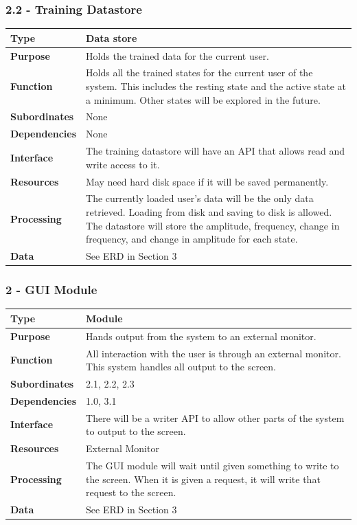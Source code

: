 \documentclass{article}
\begin{document}
\subsubsection*{2.2 - Training Datastore}
\begin{tabular}{ | l |  p{13.3cm} |}
\hline
\textbf{Type} & Data store \\ \hline
\textbf{Purpose} & Holds the trained data for the current user. \\ \hline
\textbf{Function} & Holds all the trained states for the current user of the system. This includes the resting state and the active state at a minimum. Other states will be explored in the future. \\ \hline
\textbf{Subordinates} & None \\ \hline
\textbf{Dependencies} & None \\ \hline
\textbf{Interface} & The training datastore will have an API that allows read and write access to it. \\ \hline
\textbf{Resources} & May need hard disk space if it will be saved permanently.  \\ \hline
\textbf{Processing} & The currently loaded user's data will be the only data retrieved. Loading from disk and saving to disk is allowed. The datastore will store the amplitude, frequency, change in frequency, and change in amplitude for each state.\\ \hline
\textbf{Data} & See ERD in Section 3 \\ \hline
\end{tabular}

\subsubsection*{2 - GUI Module}
\begin{tabular}{ | l |  p{13.3cm} |}
\hline
\textbf{Type} & Module \\ \hline
\textbf{Purpose} & Hands output from the system to an external monitor. \\ \hline
\textbf{Function} & All interaction with the user is through an external monitor. This system handles all output to the screen. \\ \hline
\textbf{Subordinates} & 2.1, 2.2, 2.3 \\ \hline
\textbf{Dependencies} & 1.0, 3.1 \\ \hline
\textbf{Interface} & There will be a writer API to allow other parts of the system to output to the screen. \\ \hline
\textbf{Resources} & External Monitor \\ \hline
\textbf{Processing} & The GUI module will wait until given something to write to the screen. When it is given a request, it will write that request to the screen. \\ \hline
\textbf{Data} & See ERD in Section 3 \\ \hline
\end{tabular}
\end{document}
